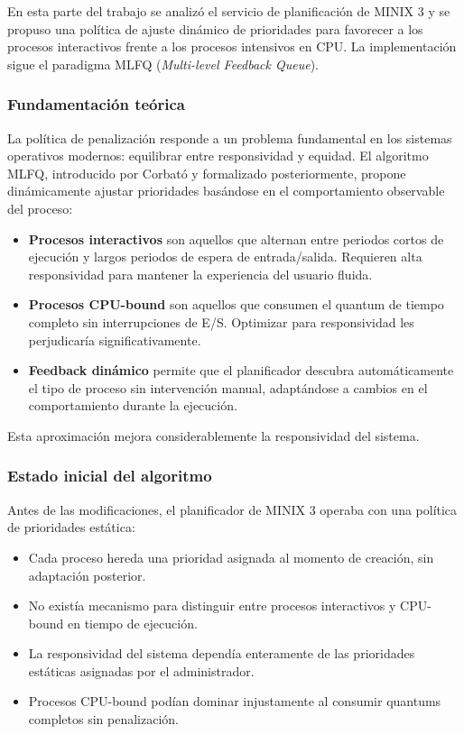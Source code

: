 \documentclass[12pt,spanish]{article}
\begin{document}
En esta parte del trabajo se analizó el servicio de planificación de MINIX 3 y se propuso una política de ajuste dinámico de prioridades para favorecer a los procesos interactivos frente a los procesos intensivos en CPU. La implementación sigue el paradigma MLFQ (\textit{Multi-level Feedback Queue}).

\subsubsection*{Fundamentación teórica}

La política de penalización responde a un problema fundamental en los sistemas operativos modernos: equilibrar entre responsividad y equidad. El algoritmo MLFQ, introducido por Corbató y formalizado posteriormente, propone dinámicamente ajustar prioridades basándose en el comportamiento observable del proceso:

\begin{itemize}
    \item \textbf{Procesos interactivos} son aquellos que alternan entre periodos cortos de ejecución y largos periodos de espera de entrada/salida. Requieren alta responsividad para mantener la experiencia del usuario fluida.
    \item \textbf{Procesos CPU-bound} son aquellos que consumen el quantum de tiempo completo sin interrupciones de E/S. Optimizar para responsividad les perjudicaría significativamente.
    \item \textbf{Feedback dinámico} permite que el planificador descubra automáticamente el tipo de proceso sin intervención manual, adaptándose a cambios en el comportamiento durante la ejecución.
\end{itemize}

Esta aproximación mejora considerablemente la responsividad del sistema.

\subsubsection*{Estado inicial del algoritmo}

Antes de las modificaciones, el planificador de MINIX 3 operaba con una política de prioridades estática:

\begin{itemize}
    \item Cada proceso hereda una prioridad asignada al momento de creación, sin adaptación posterior.
    \item No existía mecanismo para distinguir entre procesos interactivos y CPU-bound en tiempo de ejecución.
    \item La responsividad del sistema dependía enteramente de las prioridades estáticas asignadas por el administrador.
    \item Procesos CPU-bound podían dominar injustamente al consumir quantums completos sin penalización.
\end{itemize}
\end{document}
